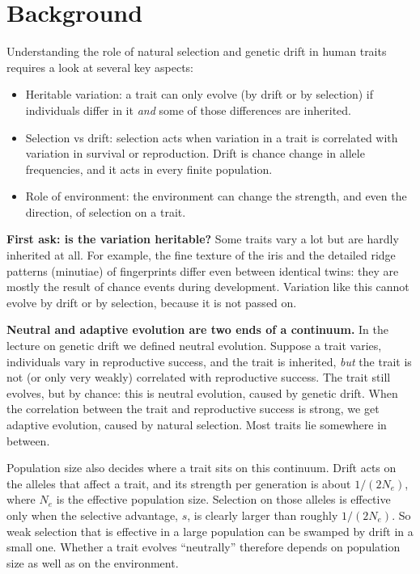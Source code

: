 \documentclass[
  a4paper]{book}
\providecommand{\tightlist}{%
  \setlength{\itemsep}{0pt}\setlength{\parskip}{0pt}}
\begin{document}
\section{Background}\label{background-15}

Understanding the role of natural selection and genetic drift in human traits requires a look at several key aspects:

\begin{itemize}
\tightlist
\item
  Heritable variation: a trait can only evolve (by drift or by selection) if individuals differ in it \emph{and} some of those differences are inherited.
\item
  Selection vs drift: selection acts when variation in a trait is correlated with variation in survival or reproduction. Drift is chance change in allele frequencies, and it acts in every finite population.
\item
  Role of environment: the environment can change the strength, and even the direction, of selection on a trait.
\end{itemize}

\textbf{First ask: is the variation heritable?} Some traits vary a lot but are hardly inherited at all. For example, the fine texture of the iris and the detailed ridge patterns (minutiae) of fingerprints differ even between identical twins: they are mostly the result of chance events during development. Variation like this cannot evolve by drift or by selection, because it is not passed on.

\textbf{Neutral and adaptive evolution are two ends of a continuum.} In the lecture on genetic drift we defined neutral evolution. Suppose a trait varies, individuals vary in reproductive success, and the trait is inherited, \emph{but} the trait is not (or only very weakly) correlated with reproductive success. The trait still evolves, but by chance: this is neutral evolution, caused by genetic drift. When the correlation between the trait and reproductive success is strong, we get adaptive evolution, caused by natural selection. Most traits lie somewhere in between.

Population size also decides where a trait sits on this continuum. Drift acts on the alleles that affect a trait, and its strength per generation is about \(1/(2N_e)\), where \(N_e\) is the effective population size. Selection on those alleles is effective only when the selective advantage, \(s\), is clearly larger than roughly \(1/(2N_e)\). So weak selection that is effective in a large population can be swamped by drift in a small one. Whether a trait evolves ``neutrally'' therefore depends on population size as well as on the environment.
\end{document}
